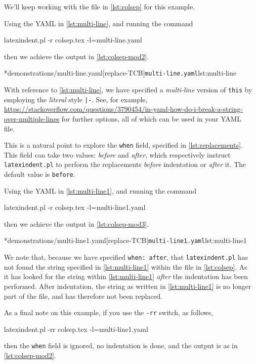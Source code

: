 	\begin{example}
		We'll keep working with the file in \vref{lst:colsep} for this example.

		Using the YAML in \cref{lst:multi-line}, and running the command
		\begin{commandshell}
latexindent.pl -r colsep.tex -l=multi-line.yaml
\end{commandshell}
		then we achieve the output in \cref{lst:colsep-mod2}.
		\begin{cmhtcbraster}[raster column skip=.01\linewidth]
			\cmhlistingsfromfile*[style=yaml-LST]*{demonstrations/multi-line.yaml}[replace-TCB]{\texttt{multi-line.yaml}}{lst:multi-line}
		\end{cmhtcbraster}
		With reference to \cref{lst:multi-line}, we have specified a \emph{multi-line} version of \texttt{this} by employing the \emph{literal}
		style \lstinline!|-!. See, for example, \href{https://stackoverflow.com/questions/3790454/in-yaml-how-do-i-break-a-string-over-multiple-lines}{https://stackoverflow.com/questions/3790454/in-yaml-how-do-i-break-a-string-over-multiple-lines}
		for further options, all of which can be used in your YAML file.

		This is a natural point to explore the \texttt{when} field, specified in \vref{lst:replacements}. This field can take two values: \emph{before}
		and \emph{after}, which respectively instruct \texttt{latexindent.pl} to perform the replacements \emph{before} indentation or \emph{after} it.
		The default value is \texttt{before}.

		Using the YAML in \cref{lst:multi-line1}, and running the command
		\begin{commandshell}
latexindent.pl -r colsep.tex -l=multi-line1.yaml
\end{commandshell}
		then we achieve the output in \cref{lst:colsep-mod3}.
		\begin{cmhtcbraster}[raster column skip=.01\linewidth]
			\cmhlistingsfromfile*[style=yaml-LST]*{demonstrations/multi-line1.yaml}[replace-TCB]{\texttt{multi-line1.yaml}}{lst:multi-line1}
		\end{cmhtcbraster}
		We note that, because we have specified \texttt{when: after}, that \texttt{latexindent.pl} has not found the string specified
		in \cref{lst:multi-line1} within the file in \vref{lst:colsep}. As it has looked for the string within \cref{lst:multi-line1} \emph{after} the indentation has been performed. After
		indentation, the string as written in \cref{lst:multi-line1} is no longer part of the file, and has therefore not been replaced.

		As a final note on this example, if you use the \texttt{-rr} switch, as follows,
		\begin{commandshell}
latexindent.pl -rr colsep.tex -l=multi-line1.yaml
\end{commandshell}
		then the \texttt{when} field is ignored, no indentation is done, and the output is as in \cref{lst:colsep-mod2}.
	\end{example}

